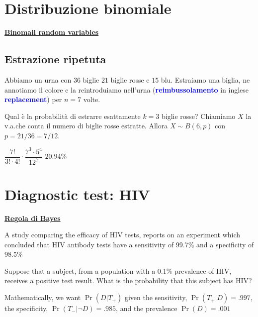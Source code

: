 \documentclass[12pt,openany]{book}
\def\emph#1{\textcolor{blue}{\textbf{\boldmath #1}}}
\theoremstyle{mio}
\theoremstyle{liscio}
\begin{document}
\hfill{}\clearpage\section{Distribuzione binomiale}
\hfill\textbf{{\color{brown}\hyperref[Binomial_rv]{Binomail random variables} \faShare}}
\subsection{Estrazione ripetuta}
\label{estrazione_biglie_ripetuta}

Abbiamo un urna con $36$ biglie $21$ biglie rosse e $15$ blu. Estraiamo una biglia, ne annotiamo il colore e la reintroduiamo nell'urna (\emph{reimbussolamento\/} in inglese \emph{replacement\/}) per $n=7$ volte.

Qual è la probabilità di estrarre esattamente $k=3$ biglie rosse? Chiamiamo $X$ la v.a.\@ che conta il numero di biglie rosse estratte. Allora $X\sim B(6,p)$ con $p=21/36=7/12$. 


\medrel{=}$\dfrac{7!}{3!\cdot4!}\cdot\dfrac{7^3\cdot5^4}{12^7}$
\medrel{=}$20.94\%$





\hfill{}\clearpage\section{Diagnostic test: HIV}
\hfill\textbf{{\color{brown}\hyperref[RegolaBayes]{Regola di Bayes} \faShare}}
\label{HIV_test}

A study comparing the efficacy of HIV tests, reports on an
experiment which concluded that HIV antibody tests have a
{\color{violet}sensitivity of 99.7\%} and a {\color{violet}specificity of 98.5\%}

Suppose that a subject, from a population with a {\color{violet} 0.1\% prevalence}
of HIV, receives a positive test result. What is the probability
that this subject has HIV?

Mathematically, we want $\Pr(D | T_+)$ given the sensitivity, {\color{violet}$\Pr(T_+
| D) = .997$}, the specificity, {\color{violet}$\Pr(T_- | \neg D) =.985$}, and the
prevalence {\color{violet}$\Pr(D) = .001$}
\end{document}
